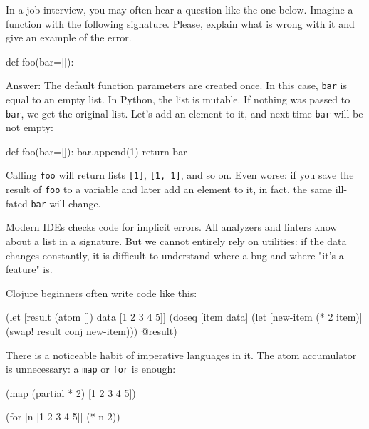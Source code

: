 In a job interview, you may often hear a question like the one below. Imagine a function with the following signature. Please, explain what is wrong with it and give an example of the error.

\begin{english}
  \begin{python}
def foo(bar=[]):
  \end{python}
\end{english}

Answer: The default function parameters are created once. In this case, \verb|bar| is equal to an empty list. In Python, the list is mutable. If nothing was passed to \verb|bar|, we get the original list. Let's add an element to it, and next time \verb|bar| will be not empty:

\begin{english}
  \begin{python}
def foo(bar=[]):
    bar.append(1)
    return bar
  \end{python}
\end{english}

Calling \verb|foo| will return lists \verb|[1]|, \verb|[1, 1]|, and so on. Even worse: if you save the result of \verb|foo| to a variable and later add an element to it, in fact, the same ill-fated \verb|bar| will change.

Modern IDEs checks code for implicit errors.
All analyzers and linters know about a list in a signature. But we cannot entirely rely on utilities: if the data changes constantly, it is difficult to understand where a bug and where "it's a feature" is.

Clojure beginners often write code like this:

\begin{english}
  \begin{clojure}
(let [result (atom [])
      data [1 2 3 4 5]]
  (doseq [item data]
    (let [new-item (* 2 item)]
      (swap! result conj new-item)))
  @result)
  \end{clojure}
\end{english}


\noindent
There is a noticeable habit of imperative languages in it. The atom accumulator is unnecessary: a \verb|map| or \verb|for| is enough:

\ifx\DEVICETYPE\MOBILE

\begin{english}
  \begin{clojure}
(map (partial * 2)
     [1 2 3 4 5])
  \end{clojure}

\splitter

  \begin{clojure}
(for [n [1 2 3 4 5]]
  (* n 2))
  \end{clojure}
\end{english}

